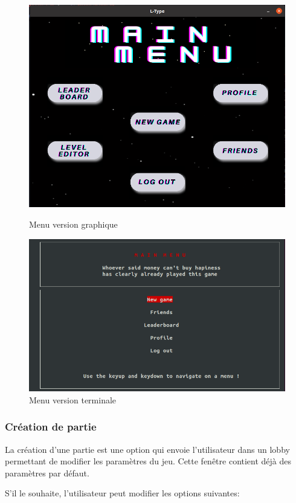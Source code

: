\documentclass[a4paper,12pt]{article}
\begin{document}
\begin{figure}[hbtp]
    \centering
    \includegraphics[scale=0.5]{images/menuGui.png}
    \caption{Menu version graphique }
    
    \includegraphics[scale=0.5]{images/menuTerm.png}
    \caption{Menu version terminale }
\end{figure}

\newpage

\subsubsection{Création de partie}
La création d'une partie est une option qui envoie l'utilisateur dans un lobby permettant de modifier les paramètres du jeu.
Cette fenêtre contient déjà des paramètres par défaut.

S'il le souhaite, l'utilisateur peut modifier les options suivantes:
\end{document}
